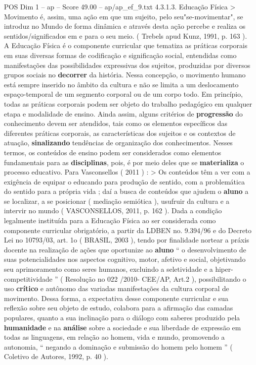 \begin{textsample}{POS Dim 1 – ap – Score 49.00 – ap/ap\_ef\_9.txt}  \label{ex:f1_pos_165}
4.3.1.3.
Educação Física > Movimento é, assim, uma ação em que um sujeito, pelo seu"se-movimentar", se introduz no Mundo de forma dinâmica e através desta ação percebe e realiza os sentidos/significados em e para o seu meio. ( Trebels apud Kunz, 1991, p. 163 ).
A Educação Física é o componente curricular que tematiza as práticas corporais em suas diversas formas de codificação e significação social, entendidas como manifestações das possibilidades expressivas dos sujeitos, produzidas por diversos grupos sociais no \textbf{decorrer} da história.
Nessa concepção, o movimento humano está sempre inserido no âmbito da cultura e não se limita a um deslocamento espaço-temporal de um segmento corporal ou de um corpo todo.
Em princípio, todas as práticas corporais podem ser objeto do trabalho pedagógico em qualquer etapa e modalidade de ensino.
Ainda assim, alguns critérios de \textbf{progressão} do conhecimento devem ser atendidos, tais como os elementos específicos das diferentes práticas corporais, as características dos sujeitos e os contextos de atuação, \textbf{sinalizando} tendências de organização dos conhecimentos.
Nesses termos, os conteúdos de ensino podem ser considerados como elementos fundamentais para as \textbf{disciplinas}, pois, é por meio deles que se \textbf{materializa} o processo educativo.
Para Vasconsellos ( 2011 ) : > Os conteúdos têm a ver com a exigência de equipar o educando para produção de sentido, com a problemática do sentido para a própria vida ; daí a busca de conteúdos que ajudem o \textbf{aluno} a se localizar, a se posicionar ( mediação semiótica ), usufruir da cultura e a intervir no mundo ( VASCONSELLOS, 2011, p. 162 ).
Dada a condição legalmente instituída para a Educação Física ao ser considerada como componente curricular obrigatório, a partir da LDBEN no. 9.394/96 e do Decreto Lei no 10793/03, art. 1o ( BRASIL, 2003 ), tendo por finalidade nortear a práxis docente na realização de ações que oportunize ao \textbf{aluno} “ o desenvolvimento de suas potencialidades nos aspectos cognitivo, motor, afetivo e social, objetivando seu aprimoramento como seres humanos, excluindo a seletividade e a hiper-competitividade ” ( Resolução no 022 /2010- CEE/AP, Art.2 ), possibilitando o uso \textbf{crítico} e autônomo das variadas manifestações da cultura corporal de movimento.
Dessa forma, a expectativa desse componente curricular e sua reflexão sobre seu objeto de estudo, colabora para a afirmação das camadas populares, quanto a sua inclinação para o diálogo com saberes produzido pela \textbf{humanidade} e na \textbf{análise} sobre a sociedade e sua liberdade de expressão em todas as linguagens, em relação ao homem, vida e mundo, promovendo a autonomia, “ negando a dominação e submissão do homem pelo homem ” ( Coletivo de Autores, 1992, p. 40 ).

\end{textsample}
